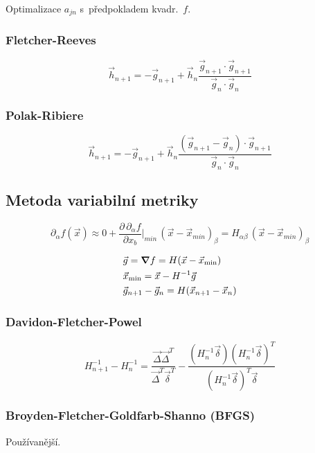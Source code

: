 \documentclass[a4paper]{article}
\newcommand\xmin{\vec x_{\mathrm{min}}}
\begin{document}
Optimalizace $a_{jn}$ s~předpokladem kvadr.~$f$.

\subsubsection{Fletcher-Reeves}
\begin{equation}
    \vec h_{n+1} = -\vec g_{n+1} + \vec h_n
    \frac{\vec g_{n+1} \cdot \vec g_{n+1}}
        {\vec g_{n} \cdot \vec g_{n}}
\end{equation}

\subsubsection{Polak-Ribiere}
\begin{equation}
    \vec h_{n+1} = -\vec g_{n+1} + \vec h_n
    \frac{(\vec g_{n+1} - \vec g_{n}) \cdot \vec g_{n+1}}
        {\vec g_{n} \cdot \vec g_{n}}
\end{equation}

\subsection{Metoda variabilní metriky}

\begin{equation}
    \partial_\alpha f(\vec x) \approx 0
    + \frac{\partial \, \partial_\alpha f}{\partial x_b} |_{min}\,
    (\vec x - \vec x_{min})_\beta
    = H_{\alpha\beta} \, (\vec x - \vec x_{min})_\beta
\end{equation}

\begin{align}
    & \vec g = \grad f = H(\vec x - \xmin) \\
    & \xmin = \vec x - H^{-1} \vec g \\
    & \vec g_{n+1} - \vec g_n = H (\vec x_{n+1} - \vec x_n)
\end{align}

\subsubsection{Davidon-Fletcher-Powel}

\begin{equation}
    H_{n+1}^{-1} - H_{n}^{-1}
    = \frac{\vec \Delta \vec \Delta^T}
        {\vec \Delta^T \vec \delta^T}
    - \frac{(H_n^{-1} \vec \delta)(H_n^{-1} \vec \delta)^T}
        {(H_n^{-1} \vec \delta)^T \vec \delta}
\end{equation}

\subsubsection{Broyden-Fletcher-Goldfarb-Shanno (BFGS)}
Používanější.
\end{document}
